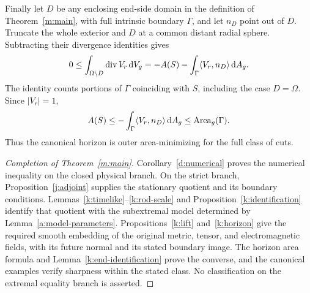 Finally let \(D\) be any enclosing end-side domain in the
definition of Theorem~\ref{m:main}, with full intrinsic
boundary \(\Gamma\), and let \(n_D\) point out of \(D\).
Truncate the whole exterior and \(D\) at a common distant
radial sphere. Subtracting their divergence identities gives
\[
 0\le\int_{\Omega\setminus D}\operatorname{div} V_r\,\mathrm d V_g
      =-A(S)-\int_\Gamma\langle V_r,n_D\rangle\,\mathrm d A_g.
\]
The identity counts portions of \(\Gamma\) coinciding with
\(S\), including the case \(D=\Omega\). Since \(|V_r|=1\),
\[
 A(S)\le-\int_\Gamma\langle V_r,n_D\rangle\,\mathrm d A_g
                                         \le\operatorname{Area}_g(\Gamma).
\]
Thus the canonical horizon is outer area-minimizing for the
full class of cuts.

\begin{proof}[Completion of Theorem~\ref{m:main}]
Corollary~\ref{d:numerical} proves the numerical inequality on
the closed physical branch. On the strict branch,
Proposition~\ref{j:adjoint} supplies the stationary quotient
and its boundary conditions. Lemmas~\ref{k:timelike}--\ref{k:rod-scale}
and Proposition~\ref{k:identification} identify that quotient
with the subextremal model determined by
Lemma~\ref{a:model-parameters}. Propositions~\ref{k:lift}
and~\ref{k:horizon} give the required smooth embedding of
the original metric, tensor, and electromagnetic fields,
with its future normal and its stated boundary image.
The horizon area formula and
Lemma~\ref{k:end-identification} prove the converse, and the
canonical examples verify sharpness within the stated class.
No classification on the extremal equality branch is asserted.
\end{proof}
